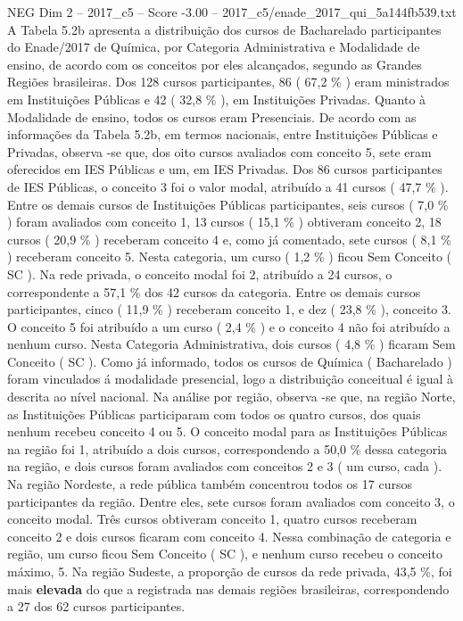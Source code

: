 \begin{textsample}{NEG Dim 2 – 2017\_c5 – Score -3.00 – 2017\_c5/enade\_2017\_qui\_5a144fb539.txt}
A Tabela 5.2b apresenta a distribuição dos cursos de Bacharelado participantes do Enade/2017 de Química, por Categoria Administrativa e Modalidade de ensino, de acordo com os conceitos por eles alcançados, segundo as Grandes Regiões brasileiras.
Dos 128 cursos participantes, 86 ( 67,2 \% ) eram ministrados em Instituições Públicas e 42 ( 32,8 \% ), em Instituições Privadas.
Quanto à Modalidade de ensino, todos os cursos eram Presenciais.
De acordo com as informações da Tabela 5.2b, em termos nacionais, entre Instituições Públicas e Privadas, observa -se que, dos oito cursos avaliados com conceito 5, sete eram oferecidos em IES Públicas e um, em IES Privadas.
Dos 86 cursos participantes de IES Públicas, o conceito 3 foi o valor modal, atribuído a 41 cursos ( 47,7 \% ).
Entre os demais cursos de Instituições Públicas participantes, seis cursos ( 7,0 \% ) foram avaliados com conceito 1, 13 cursos ( 15,1 \% ) obtiveram conceito 2, 18 cursos ( 20,9 \% ) receberam conceito 4 e, como já comentado, sete cursos ( 8,1 \% ) receberam conceito 5.
Nesta categoria, um curso ( 1,2 \% ) ficou Sem Conceito ( SC ).
Na rede privada, o conceito modal foi 2, atribuído a 24 cursos, o correspondente a 57,1 \% dos 42 cursos da categoria.
Entre os demais cursos participantes, cinco ( 11,9 \% ) receberam conceito 1, e dez ( 23,8 \% ), conceito 3.
O conceito 5 foi atribuído a um curso ( 2,4 \% ) e o conceito 4 não foi atribuído a nenhum curso.
Nesta Categoria Administrativa, dois cursos ( 4,8 \% ) ficaram Sem Conceito ( SC ).
Como já informado, todos os cursos de Química ( Bacharelado ) foram vinculados á modalidade presencial, logo a distribuição conceitual é igual à descrita ao nível nacional.
Na análise por região, observa -se que, na região Norte, as Instituições Públicas participaram com todos os quatro cursos, dos quais nenhum recebeu conceito 4 ou 5.
O conceito modal para as Instituições Públicas na região foi 1, atribuído a dois cursos, correspondendo a 50,0 \% dessa categoria na região, e dois cursos foram avaliados com conceitos 2 e 3 ( um curso, cada ).
Na região Nordeste, a rede pública também concentrou todos os 17 cursos participantes da região.
Dentre eles, sete cursos foram avaliados com conceito 3, o conceito modal.
Três cursos obtiveram conceito 1, quatro cursos receberam conceito 2 e dois cursos ficaram com conceito 4.
Nessa combinação de categoria e região, um curso ficou Sem Conceito ( SC ), e nenhum curso recebeu o conceito máximo, 5.
Na região Sudeste, a proporção de cursos da rede privada, 43,5 \%, foi mais \textbf{elevada} do que a registrada nas demais regiões brasileiras, correspondendo a 27 dos 62 cursos participantes.

\end{textsample}
